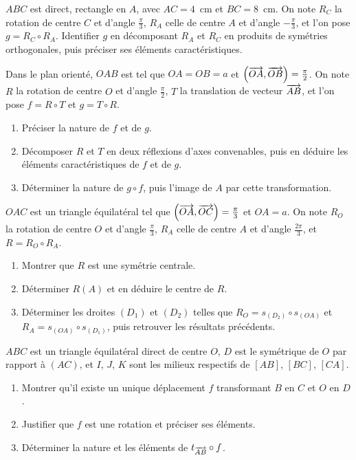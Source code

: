 \begin{annales}
$ABC$ est direct, rectangle en $A$, avec $AC = 4$~cm et $BC = 8$~cm. On note
$R_{C}$ la rotation de centre $C$ et d'angle $\frac{\pi}{3}$, $R_{A}$ celle de
centre $A$ et d'angle $-\frac{\pi}{3}$, et l'on pose $g = R_{C} \circ R_{A}$.
Identifier $g$ en décomposant $R_{A}$ et $R_{C}$ en produits de symétries
orthogonales, puis préciser ses éléments caractéristiques.

Dans le plan orienté, $OAB$ est tel que $OA = OB = a$ et
$\left(\overrightarrow{OA},\overrightarrow{OB}\right) = \frac{\pi}{2}$. On note $R$ la rotation de
centre $O$ et d'angle $\frac{\pi}{2}$, $T$ la translation de vecteur
$\overrightarrow{AB}$, et l'on pose $f = R \circ T$ et $g = T \circ R$.
\begin{enumerate}[label=\textbf{\alph*)}, leftmargin=*, itemsep=0.15em]
  \item Préciser la nature de $f$ et de $g$.
  \item Décomposer $R$ et $T$ en deux réflexions d'axes convenables, puis en
        déduire les éléments caractéristiques de $f$ et de $g$.
  \item Déterminer la nature de $g \circ f$, puis l'image de $A$ par cette
        transformation.
\end{enumerate}

$OAC$ est un triangle équilatéral tel que
$\left(\overrightarrow{OA},\overrightarrow{OC}\right) = \frac{\pi}{3}$ et $OA = a$. On note
$R_{O}$ la rotation de centre $O$ et d'angle $\frac{\pi}{3}$, $R_{A}$ celle de
centre $A$ et d'angle $\frac{2\pi}{3}$, et $R = R_{O} \circ R_{A}$.
\begin{enumerate}[label=\textbf{\alph*)}, leftmargin=*, itemsep=0.15em]
  \item Montrer que $R$ est une symétrie centrale.
  \item Déterminer $R(A)$ et en déduire le centre de $R$.
  \item Déterminer les droites $(D_{1})$ et $(D_{2})$ telles que
        $R_{O} = s_{(D_{2})} \circ s_{(OA)}$ et
        $R_{A} = s_{(OA)} \circ s_{(D_{1})}$, puis retrouver les résultats
        précédents.
\end{enumerate}

$ABC$ est un triangle équilatéral direct de centre $O$, $D$ est le symétrique
de $O$ par rapport à $(AC)$, et $I$, $J$, $K$ sont les milieux respectifs de
$[AB]$, $[BC]$, $[CA]$.
\begin{enumerate}[label=\textbf{\alph*)}, leftmargin=*, itemsep=0.15em]
  \item Montrer qu'il existe un unique déplacement $f$ transformant $B$ en $C$
        et $O$ en $D$.
  \item Justifier que $f$ est une rotation et préciser ses éléments.
  \item Déterminer la nature et les éléments de
        $t_{\overrightarrow{AB}} \circ f$.
\end{enumerate}


\end{annales}
